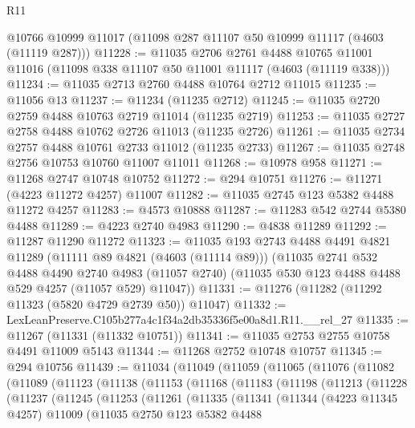 \begin{lexlean}{R11}
\begin{coremodule}
    @10766
    @10999
    @11017
    (@11098 @287 @11107 @50 @10999 @11117 (@4603 (@11119 @287)))
@11228 := @11035
    @2706
    @2761
    @4488
    @10765
    @11001
    @11016
    (@11098 @338 @11107 @50 @11001 @11117 (@4603 (@11119 @338)))
@11234 := @11035 @2713 @2760 @4488 @10764 @2712 @11015
@11235 := @11056 @13
@11237 := @11234 (@11235 @2712)
@11245 := @11035 @2720 @2759 @4488 @10763 @2719 @11014 (@11235 @2719)
@11253 := @11035 @2727 @2758 @4488 @10762 @2726 @11013 (@11235 @2726)
@11261 := @11035 @2734 @2757 @4488 @10761 @2733 @11012 (@11235 @2733)
@11267 := @11035 @2748 @2756 @10753 @10760 @11007 @11011
@11268 := @10978 @958
@11271 := @11268 @2747 @10748 @10752
@11272 := @294 @10751
@11276 := @11271 (@4223 @11272 @4257) @11007
@11282 := @11035 @2745 @123 @5382 @4488 @11272 @4257
@11283 := @4573 @10888
@11287 := @11283 @542 @2744 @5380 @4488
@11289 := @4223 @2740 @4983
@11290 := @4838 @11289
@11292 := @11287 @11290 @11272
@11323 := @11035
    @193
    @2743
    @4488
    @4491
    @4821
    @11289
    (@11111 @89 @4821 (@4603 (@11114 @89)))
    (@11035
      @2741
      @532
      @4488
      @4490
      @2740
      @4983
      (@11057 @2740)
      (@11035 @530 @123 @4488 @4488 @529 @4257 (@11057 @529) @11047))
@11331 := @11276 (@11282 (@11292 @11323 (@5820 @4729 @2739 @50)) @11047)
@11332 := LexLeanPreserve.C105b277a4c1f34a2db35336f5e00a8d1.R11.__rel_27
@11335 := @11267 (@11331 (@11332 @10751))
@11341 := @11035 @2753 @2755 @10758 @4491 @11009 @5143
@11344 := @11268 @2752 @10748 @10757
@11345 := @294 @10756
@11439 := @11034
    (@11049
      (@11059
        (@11065
          (@11076
            (@11082
              (@11089
                (@11123
                  (@11138
                    (@11153
                      (@11168
                        (@11183
                          (@11198
                            (@11213
                              (@11228
                                (@11237
                                  (@11245
                                    (@11253
                                      (@11261
                                        (@11335
                                          (@11341
                                            (@11344
                                              (@4223 @11345 @4257)
                                              @11009
                                              (@11035
                                                @2750
                                                @123
                                                @5382
                                                @4488

\end{coremodule}
\end{lexlean}
